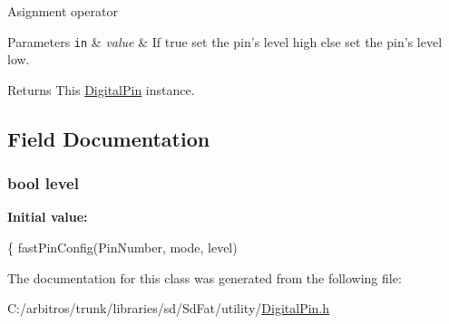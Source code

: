 Asignment operator 
\begin{DoxyParams}[1]{Parameters}
\mbox{\tt in}  & {\em value} & If true set the pin's level high else set the pin's level low.\\
\hline
\end{DoxyParams}
\begin{DoxyReturn}{Returns}
This \hyperlink{class_digital_pin}{Digital\-Pin} instance. 
\end{DoxyReturn}


\subsection{Field Documentation}
\hypertarget{class_digital_pin_a99e9667ea97bdf511cc167b924ec833c}{
\subsubsection[{level}]{\setlength{\rightskip}{0pt plus 5cm}bool level}}\label{class_digital_pin_a99e9667ea97bdf511cc167b924ec833c}
{\bfseries Initial value\-:}
\begin{DoxyCode}
\{
    fastPinConfig(PinNumber, mode, level)
\end{DoxyCode}


The documentation for this class was generated from the following file\-:\begin{DoxyCompactItemize}
\item 
C\-:/arbitros/trunk/libraries/sd/\-Sd\-Fat/utility/\hyperlink{_digital_pin_8h}{Digital\-Pin.\-h}\end{DoxyCompactItemize}
